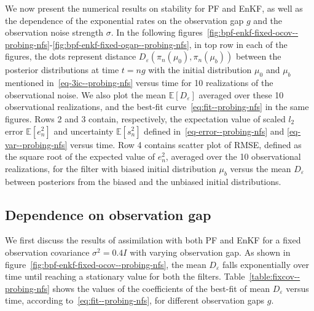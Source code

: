 We now present the numerical results on stability for PF and EnKF, as well as the dependence of the exponential rates on the observation gap $g$ and the observation noise strength $\sigma$. In the following figures~\ref{fig:bpf-enkf-fixed-ocov--probing-nfs}-\ref{fig:bpf-enkf-fixed-ogap--probing-nfs}, in top row in each of the figures, the dots represent distance $D_\varepsilon(\pi_n(\mu_0), \pi_n(\mu_b))$ between the posterior distributions at time $t=ng$ with the initial distribution $\mu_0$ and $\mu_b$ mentioned in~\eqref{eq-3ic--probing-nfs} versus time for 10 realizations of the observational noise. We also plot the mean $\mathbb{E}[D_\varepsilon]$ averaged over these 10 observational realizations, and the best-fit curve~\eqref{eq:fit--probing-nfs} in the same figures. Rows 2 and 3 contain, respectively, the expectation value of scaled $l_2$ error $\mathbb{E}[e_n^2]$ and uncertainty $\mathbb{E}[s_n^2]$ defined in~\eqref{eq-error--probing-nfs} and \eqref{eq-var--probing-nfs} versus time. Row 4 contains scatter plot of RMSE, defined as the square root of the expected value of $e_n^2$, averaged over the 10 observational realizations, for the filter with biased initial distribution $\mu_b$ versus the mean $D_\varepsilon$ between posteriors from the biased and the unbiased initial distributions.

\subsection{Dependence on observation gap}
We first discuss the results of assimilation with both PF and EnKF for a fixed observation covariance $\sigma^2 = 0.4 I$ with varying observation gap. As shown in figure~\ref{fig:bpf-enkf-fixed-ocov--probing-nfs}, the mean $D_\varepsilon$ falls exponentially over time until reaching a stationary value for both the filters. Table~\ref{table:fixcov--probing-nfs} shows the values of the coefficients of the best-fit of mean $D_\varepsilon$ versus time, according to~\eqref{eq:fit--probing-nfs}, for different observation gaps $g$.




